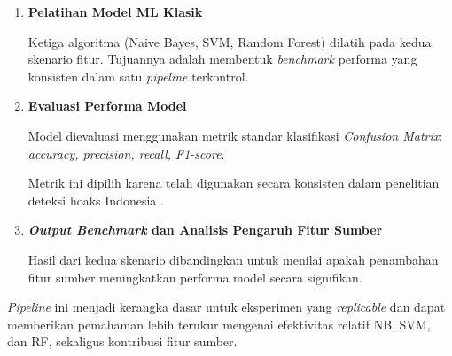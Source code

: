 \begin{enumerate}
\begin{itemize}
            Menggunakan hanya fitur TF-IDF. Skenario ini berfungsi sebagai baseline dan merepresentasikan pendekatan penelitian terdahulu yang umumnya bergantung pada konten teks saja.

            \item \textbf{Skenario 2 : \textit{Content + Source}} (menggabungkan TF-IDF dengan fitur sumber.)
            
            Menggabungkan fitur TF-IDF dengan fitur sumber hasil encoding. Skenario ini memungkinkan evaluasi empiris mengenai apakah penambahan informasi sumber memberikan peningkatan performa atau tidak.\\

        \end{itemize}
        
        Kedua skenario ini disusun untuk memastikan bahwa efek penambahan metadata dapat dinilai secara objektif karena seluruh elemen \textit{pipeline} selain fitur tetap sama.\\
    
    \item \textbf{Pelatihan Model ML Klasik}
    
    Ketiga algoritma (Naive Bayes, SVM, Random Forest) dilatih pada kedua skenario fitur. Tujuannya adalah membentuk \textit{benchmark} performa yang konsisten dalam satu \textit{pipeline} terkontrol.

    \item \textbf{Evaluasi Performa Model}
    
    Model dievaluasi menggunakan metrik standar klasifikasi \textit{Confusion Matrix}: \textit{accuracy, precision, recall, F1-score}.

    Metrik ini dipilih karena telah digunakan secara konsisten dalam penelitian deteksi hoaks Indonesia \autocite{triyono2023indonesian, safira2023comparative}.

    \item \textbf{\textit{Output Benchmark} dan Analisis Pengaruh Fitur Sumber}

    Hasil dari kedua skenario dibandingkan untuk menilai apakah penambahan fitur sumber meningkatkan performa model secara signifikan. \\

\end{enumerate}

\textit{Pipeline} ini menjadi kerangka dasar untuk eksperimen yang \textit{replicable} dan dapat memberikan pemahaman lebih terukur mengenai efektivitas relatif NB, SVM, dan RF, sekaligus kontribusi fitur sumber.

